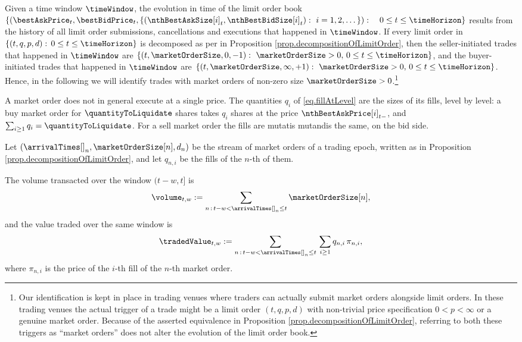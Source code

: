 Given a time window $\timeWindow$,
the evolution in time of the limit order book
$\lbrace (\bestAskPrice_t, \bestBidPrice_t,\lbrace (\nthBestAskSize[i]_t, \nthBestBidSize[i]_t) : \, \, i=1,2,\dots\rbrace): \quad 0\leq t \leq \timeHorizon \rbrace$
results from the history of all limit order submissions,
cancellations and executions that happened in $\timeWindow$.
If every limit order in $\lbrace (t,q,p,d): \, 0\leq t\leq \timeHorizon\rbrace$
is decomposed as per in Proposition \ref{prop.decompositionOfLimitOrder},
then the seller-initiated trades that happened in $\timeWindow$ are
$\lbrace (t,\marketOrderSize,0,-1):\, \, \marketOrderSize>0, \, 0\leq t\leq \timeHorizon \rbrace$,
and the buyer-initiated trades that happened in $\timeWindow$ are
$\lbrace (t,\marketOrderSize,\infty,+1):\, \, \marketOrderSize>0, \, 0\leq t\leq \timeHorizon \rbrace$.
Hence, in the following we will identify trades with market orders
of non-zero size $\marketOrderSize>0$.\footnote{
Our identification is kept in place in trading venues
where traders can actually submit market orders alongside limit orders.
In these trading venues the actual trigger of a trade might be a limit order $(t,q,p,d)$
with non-trivial price specification $0<p<\infty$ or a genuine market order.
Because of the asserted equivalence in Proposition \ref{prop.decompositionOfLimitOrder},
referring to both these triggers as ``market orders''
does not alter the evolution of the limit order book.
}

A market order does not in general execute at a single price.
The quantities $q_i$ of \eqref{eq.fillAtLevel} are the sizes of its fills,
level by level:
a buy market order for $\quantityToLiquidate$ shares
takes $q_i$ shares at the price $\nthBestAskPrice[i]_{t-}$,
and $\sum_{i\geq1}q_i = \quantityToLiquidate$.
For a sell market order the fills are mutatis mutandis the same, on the bid side.

Let $(\arrivalTimes[]_n, \marketOrderSize[n], d_n)$ be the stream of market orders
of a trading epoch,
written as in Proposition \ref{prop.decompositionOfLimitOrder},
and let $q_{n,i}$ be the fills of the $n$-th of them.

\begin{defi}
The volume transacted over the window $(t-w, t]$ is
\begin{equation}
\label{eq.transactedVolume}
\volume_{t,w} := \sum_{n \, : \, t-w < \arrivalTimes[]_n \leq t} \marketOrderSize[n] ,
\end{equation}
and the value traded over the same window is
\begin{equation}
\label{eq.tradedValue}
\tradedValue_{t,w}
:=
\sum_{n \, : \, t-w < \arrivalTimes[]_n \leq t} \, \sum_{i \geq 1} q_{n,i} \, \pi_{n,i} ,
\end{equation}
where $\pi_{n,i}$ is the price of the $i$-th fill of the $n$-th market order.
\end{defi}

